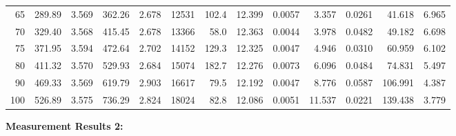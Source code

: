 \documentclass[10pt]{article}
\begin{document}
{\begin{tabular}{|r|rr|rr|rr|rr|rr|r|r|}
       65 &       289.89 &        3.569 &       362.26 &        2.678 &        12531 &        102.4 &       12.399 &       0.0057 &        3.357 &       0.0261 &       41.618 &        6.965 \\
       70 &       329.40 &        3.568 &       415.45 &        2.678 &        13366 &         58.0 &       12.363 &       0.0044 &        3.978 &       0.0482 &       49.182 &        6.698 \\
       75 &       371.95 &        3.594 &       472.64 &        2.702 &        14152 &        129.3 &       12.325 &       0.0047 &        4.946 &       0.0310 &       60.959 &        6.102 \\
       80 &       411.32 &        3.570 &       529.93 &        2.684 &        15074 &        182.7 &       12.276 &       0.0073 &        6.096 &       0.0484 &       74.831 &        5.497 \\
       90 &       469.33 &        3.569 &       619.79 &        2.903 &        16617 &         79.5 &       12.192 &       0.0047 &        8.776 &       0.0587 &      106.991 &        4.387 \\
      100 &       526.89 &        3.575 &       736.29 &        2.824 &        18024 &         82.8 &       12.086 &       0.0051 &       11.537 &       0.0221 &      139.438 &        3.779 \\
\hline
\end{tabular}
}

\vspace{3mm}

\noindent
{\large \bf Measurement Results 2:}
\vspace{3mm}
\end{document}
